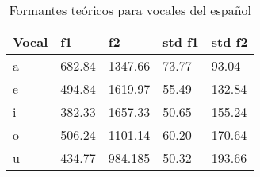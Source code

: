 \begin{table}[H]
\centering
\caption{Formantes teóricos para vocales del español}
\label{tab:formantes_observador}
\begin{tabular}{|l|l|l|l|l|}
\hline
\textbf{Vocal} & \textbf{f1} & \textbf{f2} & \textbf{std f1} & \textbf{std f2} \\ \hline
a   & 682.84 & 1347.66 & 73.77 & 93.04 \\ \hline
e   & 494.84 & 1619.97 & 55.49 & 132.84\\ \hline
i   & 382.33 & 1657.33 & 50.65 & 155.24 \\ \hline
o   & 506.24 & 1101.14 & 60.20 & 170.64\\ \hline
u   & 434.77 & 984.185 & 50.32 & 193.66\\ \hline

\end{tabular}
\end{table}
